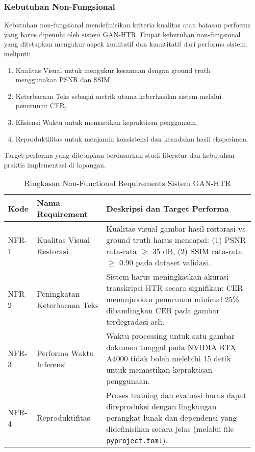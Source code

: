 \documentclass[12pt,a4paper]{article}
\begin{document}
\clearpage
\subsubsection{Kebutuhan Non-Fungsional} %

Kebutuhan non-fungsional mendefinisikan kriteria kualitas atau batasan performa yang harus dipenuhi oleh sistem GAN-HTR. Empat kebutuhan non-fungsional yang ditetapkan mengukur aspek kualitatif dan kuantitatif dari performa sistem, meliputi:

\begin{enumerate}
    \item Kualitas Visual untuk mengukur kesamaan dengan ground truth menggunakan PSNR dan SSIM,
    \item Keterbacaan Teks sebagai metrik utama keberhasilan sistem melalui penurunan CER,
    \item Efisiensi Waktu untuk memastikan kepraktisan penggunaan,
    \item Reproduktifitas untuk menjamin konsistensi dan keandalan hasil eksperimen.
\end{enumerate}
Target performa yang ditetapkan berdasarkan studi literatur dan kebutuhan praktis implementasi di lapangan.

\begin{table}[H]
\centering
\caption{Ringkasan Non-Functional Requirements Sistem GAN-HTR}
\label{tab:non_functional_requirements}
\begin{tabular}{p{}p{}p{}}
\toprule
\textbf{Kode} & \textbf{Nama Requirement} & \textbf{Deskripsi dan Target Performa} \\
\midrule
NFR-1 & Kualitas Visual Restorasi & Kualitas visual gambar hasil restorasi vs ground truth harus mencapai: (1) PSNR rata-rata $\geq$ 35 dB, (2) SSIM rata-rata $\geq$ 0.90 pada dataset validasi. \\
\midrule
NFR-2 & Peningkatan Keterbacaan Teks & Sistem harus meningkatkan akurasi transkripsi HTR secara signifikan: CER menunjukkan penurunan minimal 25\% dibandingkan CER pada gambar terdegradasi asli. \\
\midrule
NFR-3 & Performa Waktu Inferensi & Waktu processing untuk satu gambar dokumen tunggal pada NVIDIA RTX A4000 tidak boleh melebihi 15 detik untuk memastikan kepraktisan penggunaan. \\
\midrule
NFR-4 & Reproduktifitas & Proses training dan evaluasi harus dapat direproduksi dengan lingkungan perangkat lunak dan dependensi yang didefinisikan secara jelas (melalui file \texttt{pyproject.toml}). \\
\bottomrule
\end{tabular}
\end{table}
\end{document}
